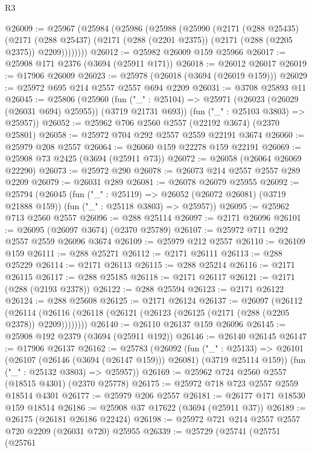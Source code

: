 \begin{lexlean}{R3}
\begin{coremodule}
@26009 := @25967
    (@25984
      (@25986
        (@25988
          (@25990
            (@2171
              (@288 @25435)
              (@2171
                (@288 @25437)
                (@2171 (@288 (@2201 @2375)) (@2171 (@288 (@2205 @2375)) @2209))))))))
@26012 := @25982 @26009 @159 @25966
@26017 := @25908 @171 @2376 (@3694 (@25911 @171))
@26018 := @26012 @26017
@26019 := @17906 @26009
@26023 := @25978 (@26018 (@3694 (@26019 @159)))
@26029 := @25972 @695 @214 @2557 @2557 @694 @2209
@26031 := @3708 @25893 @11
@26045 := @25806
    (@25960
      (fun ("_" : @25104) => @25971 (@26023 (@26029 (@26031 @694) @25955)) (@3719 @21731 @693))
      (fun ("_" : @25103 @3803) => @25957))
@26052 := @25962 @706 @2560 @2557 (@22192 @3674) (@2370 @25801)
@26058 := @25972 @704 @292 @2557 @2559 @22191 @3674
@26060 := @25979 @208 @2557
@26064 := @26060 @159 @22278 @159 @22191
@26069 := @25908 @73 @2425 (@3694 (@25911 @73))
@26072 := @26058 (@26064 @26069 @22290)
@26073 := @25972 @290
@26078 := @26073 @214 @2557 @2557 @289 @2209
@26079 := @26031 @289
@26081 := @26078 @26079 @25955
@26092 := @25794
    (@26045
      (fun ("_" : @25119) => @26052 (@26072 @26081) (@3719 @21888 @159))
      (fun ("_" : @25118 @3803) => @25957))
@26095 := @25962 @713 @2560 @2557
@26096 := @288 @25114
@26097 := @2171 @26096
@26101 := @26095 (@26097 @3674) (@2370 @25789)
@26107 := @25972 @711 @292 @2557 @2559 @26096 @3674
@26109 := @25979 @212 @2557
@26110 := @26109 @159
@26111 := @288 @25271
@26112 := @2171 @26111
@26113 := @288 @25229
@26114 := @2171 @26113
@26115 := @288 @25214
@26116 := @2171 @26115
@26117 := @288 @25185
@26118 := @2171 @26117
@26121 := @2171 (@288 (@2193 @2378))
@26122 := @288 @25594
@26123 := @2171 @26122
@26124 := @288 @25608
@26125 := @2171 @26124
@26137 := @26097
    (@26112
      (@26114 (@26116 (@26118 (@26121 (@26123 (@26125 (@2171 (@288 (@2205 @2378)) @2209))))))))
@26140 := @26110 @26137 @159 @26096
@26145 := @25908 @192 @2379 (@3694 (@25911 @192))
@26146 := @26140 @26145
@26147 := @17906 @26137
@26162 := @25783
    (@26092
      (fun ("_" : @25133) =>
      @26101 (@26107 (@26146 (@3694 (@26147 @159))) @26081) (@3719 @25114 @159))
      (fun ("_" : @25132 @3803) => @25957))
@26169 := @25962 @724 @2560 @2557 (@18515 @4301) (@2370 @25778)
@26175 := @25972 @718 @723 @2557 @2559 @18514 @4301
@26177 := @25979 @206 @2557
@26181 := @26177 @171 @18530 @159 @18514
@26186 := @25908 @37 @17622 (@3694 (@25911 @37))
@26189 := @26175 (@26181 @26186 @22424)
@26198 := @25972 @721 @214 @2557 @2557 @720 @2209 (@26031 @720) @25955
@26339 := @25729
    (@25741
      (@25751
        (@25761

\end{coremodule}
\end{lexlean}
